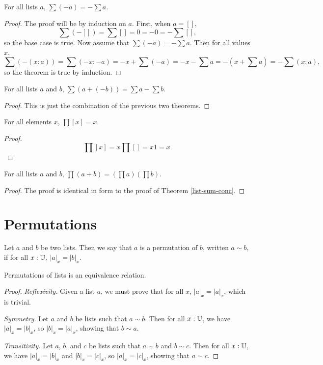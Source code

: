 \documentclass[../math.tex]{subfiles}
\begin{document}
\begin{theorem} \label{list-sum-neg}
    For all lists $a$, $\sum (-a) = -\sum a$.
\end{theorem}
\begin{proof}
    The proof will be by induction on $a$.  First, when $a = []$,
    \[
        \sum (-[]) = \sum [] = 0 = -0 = -\sum [],
    \]
    so the base case is true.  Now assume that $\sum (-a) = -\sum a$.  Then for
    all values $x$,
    \[
        \sum (-(x : a)) = \sum(-x : -a) = -x + \sum (-a) = -x - \sum a = -(x +
        \sum a) = -\sum (x : a),
    \]
    so the theorem is true by induction.
\end{proof}

\begin{theorem} \label{list-sum-minus}
    For all lists $a$ and $b$, $\sum (a + (-b)) = \sum a - \sum b$.
\end{theorem}
\begin{proof}
    This is just the combination of the previous two theorems.
\end{proof}

\begin{theorem}
    For all elements $x$, $\prod [x] = x$.
\end{theorem}
\begin{proof}
    \[
        \prod [x] = x \prod [] = x 1 = x.
    \]
\end{proof}

\begin{theorem} \label{list-prod-conc}
    For all lists $a$ and $b$, $\prod (a + b) = (\prod a) (\prod b)$.
\end{theorem}
\begin{proof}
    The proof is identical in form to the proof of Theorem \ref{list-sum-conc}.
\end{proof}

\section{Permutations}

\begin{definition}
    Let $a$ and $b$ be two lists.  Then we say that $a$ is a permutation of $b$,
    written $a \sim b$, if for all $x : \mathbb{U}$, $|a|_x = |b|_x$.
\end{definition}

\begin{instance}
    Permutations of lists is an equivalence relation.
\end{instance}
\begin{proof}
    \textit{Reflexivity.}  Given a list $a$, we must prove that for all $x$,
    $|a|_x = |a|_x$, which is trivial.

    \textit{Symmetry.}  Let $a$ and $b$ be lists such that $a \sim b$.  Then for
    all $x : \mathbb{U}$, we have $|a|_x = |b|_x$, so $|b|_x = |a|_x$, showing that $b
    \sim a$.

    \textit{Transitivity.} Let $a$, $b$, and $c$ be lists such that $a \sim b$
    and $b \sim c$.  Then for all $x : \mathbb{U}$, we have $|a|_x = |b|_x$ and $|b|_x =
    |c|_x$, so $|a|_x = |c|_x$, showing that $a \sim c$.
\end{proof}
\end{document}
